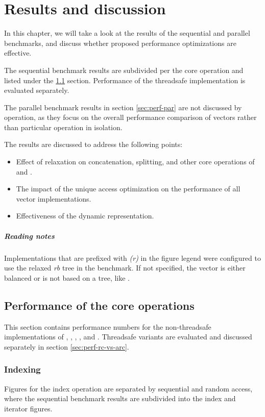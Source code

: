 \newcommand{\relaxed}{\emph{(r)}}

\chapter{Results and discussion}
In this chapter, we will take a look at the results of the sequential and parallel benchmarks, and discuss whether proposed performance optimizations are effective. 

The sequential benchmark results are subdivided per the core operation and listed under the \ref{sec:perf-seq} section. Performance of the threadsafe implementation is evaluated separately.  

The parallel benchmark results in section \ref{sec:perf-par} are not discussed by operation, as they focus on the overall performance comparison of vectors rather than particular operation in isolation. 

The results are discussed to address the following points:
\begin{itemize}
    \item Effect of \rrbtree{} relaxation on concatenation, splitting, and other core operations of \rrbvec{} and \pvec{}. 
    \item The impact of the unique access optimization on the performance of all vector implementations.
    \item Effectiveness of the dynamic representation.
\end{itemize}

\paragraph{Reading notes} 
Implementations that are prefixed with \relaxed{} in the figure legend were configured to use the relaxed \emph{rb} tree in the benchmark. If not specified, the vector is either balanced or is not based on a tree, like \stdvec{}. 

\section{Performance of the core operations}
\label{sec:perf-seq}
This section contains performance numbers for the non-threadsafe implementations of \stdvec{}, \rbvec{}, \rrbvec{}, \pvec{}, and \imrsvec{}. Threadsafe variants are evaluated and discussed separately in section \ref{sec:perf-rc-vs-arc}. 

\subsection{Indexing}
Figures for the index operation are separated by sequential and random access, where the sequential benchmark results are subdivided into the index and iterator figures. 

